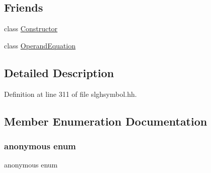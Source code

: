\subsection*{Friends}
\begin{DoxyCompactItemize}
\item 
class \mbox{\hyperlink{class_operand_symbol_a519e920ccec7617186a838b3258ff7d2}{Constructor}}
\item 
class \mbox{\hyperlink{class_operand_symbol_a466eb718dfbfae6a840e546d48e95627}{Operand\+Equation}}
\end{DoxyCompactItemize}


\subsection{Detailed Description}


Definition at line 311 of file slghsymbol.\+hh.



\subsection{Member Enumeration Documentation}
\mbox{\label{class_operand_symbol_a632b0e8d56cbf7fa6dfc31f03371b95b}} 
\subsubsection{\texorpdfstring{anonymous enum}{anonymous enum}}
{\footnotesize\ttfamily anonymous enum}

